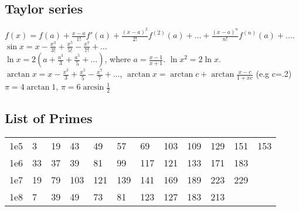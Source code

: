 \documentclass[12pt]{extarticle}
\begin{document}
\begin{multicols*}{2}
\subsection{Taylor series}
$f(x) = f(a) + \frac{x-a}{1!} f'(a) + \frac{(x-a)^2}{2!} f^{(2)}(a) + \dots + \frac{(x-a)^n}{n!} f^{(n)}(a) + \dots$. \\
$\sin x = x - \frac{x^3}{3!} + \frac{x^5}{5!} - \frac{x^7}{7!} + \dots$ \\
$\ln x = 2(a+\frac{a^3}{3}+\frac{a^5}{5}+\dots)$, where $a=\frac{x-1}{x+1}$. $\ln x^2 = 2 \ln x$. \\
$\arctan x = x - \frac{x^3}{3} + \frac{x^5}{5} - \frac{x^7}{7} + \dots$,
$\arctan x = \arctan c + \arctan \frac{x-c}{1+xc}$ (e.g c=.2) \\
$\pi = 4 \arctan 1$, $\pi = 6 \arcsin \frac{1}{2}$


\subsection{List of Primes}

\begin{tabular}{l l l l l l l l l l l l}
    1e5 & 3 & 19 & 43 & 49 & 57 & 69 & 103 & 109 & 129 & 151 & 153 \\
    1e6 & 33 & 37 & 39 & 81 & 99 & 117 & 121 & 133 & 171 & 183 \\
    1e7 & 19 & 79 & 103 & 121 & 139 & 141 & 169 & 189 & 223 & 229 \\
    1e8 & 7 & 39 & 49 & 73 & 81 & 123 & 127 & 183 & 213 \\
\end{tabular}

\end{multicols*}
\end{document}
